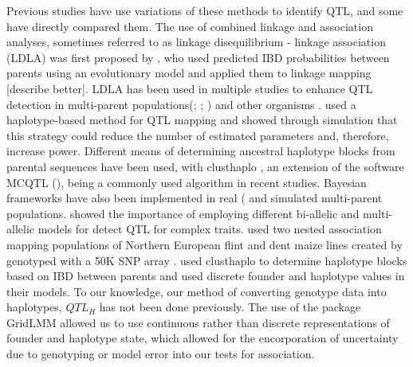 \documentclass[article,9pt,twocolumn,twoside]{rilabRxiv}
\begin{document}
Previous studies have use variations of these methods to identify QTL, and some have directly compared them.
The use of combined linkage and association analyses, sometimes referred to as linkage disequilibrium - linkage association (LDLA) was first proposed by \cite{Meuwissen}, who used predicted IBD probabilities between parents using an evolutionary model and applied them to linkage mapping [describe better].
LDLA has been used in multiple studies to enhance QTL detection in multi-parent populations(\cite{Giraud2};  \cite{Yu2}; \cite{McMullen}) and other organisms \cite{Herault}.
\cite{Jansen} used a haplotype-based method for QTL mapping and showed through simulation that this strategy could reduce the number of estimated parameters and, therefore, increase power.
Different means of determining ancestral haplotype blocks from parental sequences have been used, with clusthaplo \cite{Leroux}, an extension of the software MCQTL (\cite{Jourjon}), being a commonly used algorithm in recent studies.
Bayesian frameworks have also been implemented in real (\cite{PerezEnciso} and simulated \cite{Bink} multi-parent populations.
\cite{Bardol} showed the importance of employing different bi-allelic and multi-allelic models for detect QTL for complex traits.
\cite{Giraud} used two nested association mapping populations of Northern European flint and dent maize lines created by \citep{Bauer} genotyped with a 50K SNP array \cite{Ganal}.
\cite{Giraud} used clusthaplo to determine haplotype blocks based on IBD between parents and used discrete founder and haplotype values in their models.
To our knowledge, our method of converting genotype data into haplotypes, $QTL_H$ has not been done previously.
The use of the package GridLMM \cite{Runcie} allowed us to use continuous rather than discrete representations of founder and haplotype state, which allowed for the encorporation of uncertainty due to genotyping or model error into our tests for association.
\end{document}
